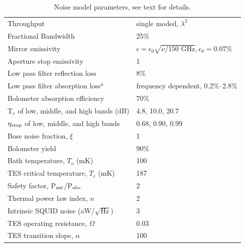 \documentclass[]{spie}  %
\begin{document}
\begin{table}[ht]
\centering
\caption{Noise model parameters, see text for details. }
\label{tab:assume}
%
\begin{tabular}{|l|l|}
\hline
Throughput                       & single moded, $\lambda^2$          \\
Fractional Bandwidth             & 25\%                                             \\
Mirror emissivity                & $\epsilon = \epsilon_0\sqrt{\nu/\text{150~GHz}}, \epsilon_0 = 0.07\%$ \\
Aperture stop emissivity         & 1                                                \\
Low pass filter reflection loss  & 8\%                                                \\
Low pass filter absorption loss$^a$  & frequency dependent, 0.2\%--2.8\%             \\
Bolometer absorption efficiency  & 70\%                                             \\
T$_e$ of low, middle, and high bands (dB) & 4.8, 10.0, 20.7                                               \\
$\eta_{\rm stop}$ of low, middle, and high bands & 0.68, 0.90, 0.99   \\
Bose noise fraction, $\xi$       & 1                                                \\
Bolometer yield                 & 90\%                                             \\
Bath temperature, $T_o$ (mK)    & 100                                              \\
TES critical temperature, $T_c$ (mK)   & 187                                              \\
Safety factor, P$_{\rm sat}$/P$_{\rm abs}$      & 2                                                \\
Thermal power law index, $n$    & 2                                                \\
Intrinsic SQUID noise (aW/$\sqrt{\text{Hz}}$)   & 3                        \\
TES operating resistance, $\Omega$    &  0.03                               \\
TES transition slope, $\alpha$    & 100                                         \\

\end{tabular}
\end{table}
\end{document}
